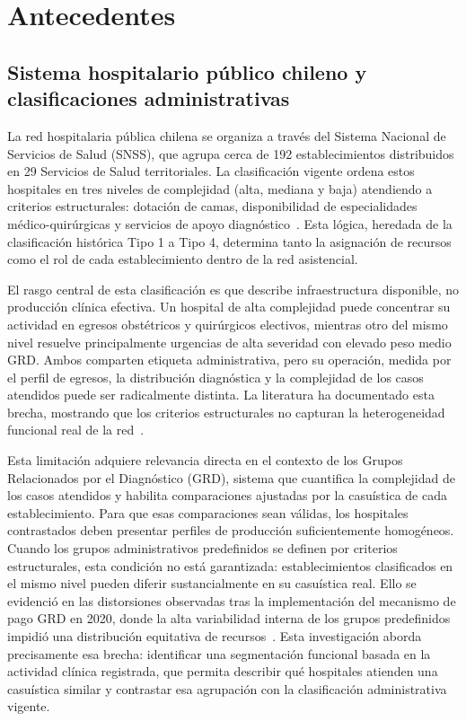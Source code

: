\chapter{Antecedentes}
\label{cap:marco}

\section{Sistema hospitalario público chileno y clasificaciones administrativas}

\label{sec:sistema-hospitalario}

La red hospitalaria pública chilena se organiza a través del Sistema Nacional de
Servicios de Salud (SNSS), que agrupa cerca de 192 establecimientos distribuidos
en 29 Servicios de Salud territoriales. La clasificación vigente ordena estos
hospitales en tres niveles de complejidad (alta, mediana y baja) atendiendo
a criterios estructurales: dotación de camas, disponibilidad de especialidades
médico-quirúrgicas y servicios de apoyo diagnóstico~\citep{Cid2024}. Esta lógica,
heredada de la clasificación histórica Tipo 1 a Tipo 4, determina tanto la
asignación de recursos como el rol de cada establecimiento dentro de la red
asistencial.

El rasgo central de esta clasificación es que describe infraestructura disponible,
no producción clínica efectiva. Un hospital de alta complejidad puede concentrar
su actividad en egresos obstétricos y quirúrgicos electivos, mientras otro del
mismo nivel resuelve principalmente urgencias de alta severidad con elevado peso
medio GRD. Ambos comparten etiqueta administrativa, pero su operación, medida
por el perfil de egresos, la distribución diagnóstica y la complejidad de los
casos atendidos puede ser radicalmente distinta. La literatura ha documentado
esta brecha, mostrando que los criterios estructurales no capturan la
heterogeneidad funcional real de la red~\citep{Havranek2023, Cid2024}.

Esta limitación adquiere relevancia directa en el contexto de los Grupos
Relacionados por el Diagnóstico (GRD), sistema que cuantifica la complejidad de
los casos atendidos y habilita comparaciones ajustadas por la casuística
de cada establecimiento. Para que esas comparaciones sean válidas, los
hospitales contrastados deben presentar perfiles de producción suficientemente
homogéneos. Cuando los grupos administrativos predefinidos se definen por
criterios estructurales, esta condición no está garantizada: establecimientos
clasificados en el mismo nivel pueden diferir sustancialmente en su casuística
real. Ello se evidenció en las distorsiones observadas tras la implementación
del mecanismo de pago GRD en 2020, donde la alta variabilidad interna de los
grupos predefinidos impidió una distribución equitativa de
recursos~\citep{Cid2024}. Esta investigación aborda precisamente
esa brecha: identificar una segmentación funcional basada en la actividad
clínica registrada, que permita describir qué hospitales atienden una
casuística similar y contrastar esa agrupación con la clasificación
administrativa vigente.

